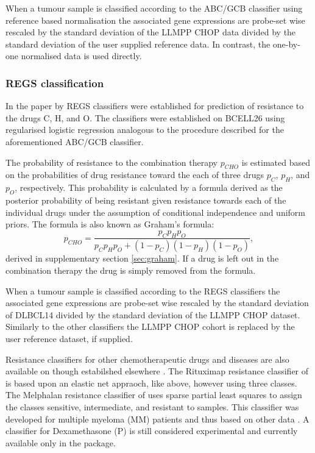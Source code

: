 \documentclass{article}
\begin{document}
When a tumour sample is classified according to the ABC/GCB classifier using reference based normalisation the associated gene expressions are probe-set wise rescaled by the standard deviation of the LLMPP CHOP data divided by the standard deviation of the user supplied reference data.
In contrast, the one-by-one normalised data is used directly.

\subsubsection{REGS classification}
In the paper by \citet{Falgreen2015} REGS classifiers were established for prediction of resistance to the drugs C, H, and O.
The classifiers were established on BCELL26 using regularised logistic regression analogous to the procedure described for the aforementioned ABC/GCB classifier.

The probability of resistance to the combination therapy $p_{CHO}$ is estimated based on the probabilities of drug resistance toward the each of three drugs $p_C$, $p_H$, and $p_O$, respectively.
This probability is calculated by a formula derived as the posterior probability of being resistant given resistance towards each of the individual drugs under the assumption of conditional independence and uniform priors.
The formula is also known as Graham's formula:
\begin{equation*}
  p_{CHO} = \frac{p_C p_H p_O}{p_C p_H p_O + (1 - p_C)(1 - p_H)(1 - p_O)},
\end{equation*}
derived in supplementary section \ref{sec:graham}.
If a drug is left out in the combination therapy the drug is simply removed from the formula.

When a tumour sample is classified according to the REGS classifiers the associated gene expressions are probe-set wise rescaled by the standard deviation of DLBCL14 divided by the standard deviation of the LLMPP CHOP dataset.
Similarly to the other classifiers the LLMPP CHOP cohort is replaced by the user reference dataset, if supplied.

Resistance classifiers for other chemotherapeutic drugs and diseases are also available on \hemaClass{} though estabilshed elsewhere \citep{Boegsted2011,Bogsted2013,Laursen2014}.
The Rituximap resistance classifier of \citet{Laursen2014} is based upon an elastic net appraoch, like above, however using three classes.
The Melphalan resistance classifier of \citet{Boegsted2011} uses sparse partial least squares to assign the classes sensitive, intermediate, and resistant to samples.
This classifier was developed for multiple myeloma (MM) patients and thus based on other data \citep{Boegsted2011}.
A classifier for Dexamethasone (P) is still considered experimental and currently available only in the package.
\end{document}
